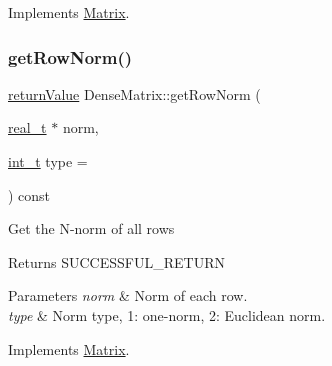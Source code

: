 Implements \hyperlink{class_matrix_ac4c0a395cd507ba0801b731765c586f7}{Matrix}.

\mbox{\label{class_dense_matrix_a1d3faae6ae439acdb478a6ca8a67e776}} 
\subsubsection{\texorpdfstring{get\+Row\+Norm()}{getRowNorm()}\hspace{0.1cm}{\footnotesize\ttfamily [2/2]}}
{\footnotesize\ttfamily \hyperlink{_message_handling_8hpp_a81d556f613bfbabd0b1f9488c0fa865e}{return\+Value} Dense\+Matrix\+::get\+Row\+Norm (\begin{DoxyParamCaption}\item[{\hyperlink{qp_o_a_s_e_s__wrapper_8h_a0d00e2b3dfadee81331bbb39068570c4}{real\+\_\+t} $\ast$}]{norm,  }\item[{\hyperlink{_types_8hpp_ab6fd6105e64ed14a0c9281326f05e623}{int\+\_\+t}}]{type = {} }\end{DoxyParamCaption}) const\hspace{0.3cm}{\ttfamily [virtual]}}

Get the N-\/norm of all rows \begin{DoxyReturn}{Returns}
S\+U\+C\+C\+E\+S\+S\+F\+U\+L\+\_\+\+R\+E\+T\+U\+RN 
\end{DoxyReturn}

\begin{DoxyParams}{Parameters}
{\em norm} & Norm of each row. \\
\hline
{\em type} & Norm type, 1\+: one-\/norm, 2\+: Euclidean norm. \\
\hline
\end{DoxyParams}


Implements \hyperlink{class_matrix_a7809892ec8eefd5963915b56564917ed}{Matrix}.

\mbox{\label{class_dense_matrix_a678aa0cfc8fe238e4497e47d68d25d88}} 
